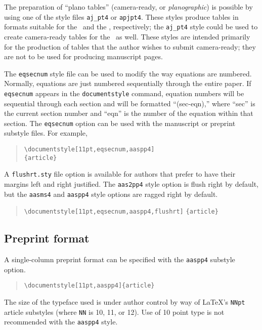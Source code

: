 The preparation of ``plano tables'' (camera-ready, or {\sl planographic\/})
is possible by using one of the style files \verb"aj_pt4" or \verb"apjpt4".
These styles produce tables in formats suitable for the \aj\ and the
\apj, respectively; the \verb"aj_pt4" style could be used to create
camera-ready tables for the \pasp\ as well.  These styles are intended
primarily for the production of tables that the author wishes to
submit camera-ready; they are not to be used for producing manuscript pages.

The {\tt eqsecnum} style file can be used to modify the way equations are
numbered.  Normally, equations are just numbered sequentially through the 
entire paper.  If {\tt eqsecnum} appears in the {\tt documentstyle} command, 
equation 
numbers will be sequential through each section and will be formatted 
``(sec-eqn),'' where ``sec'' is the current section number and ``eqn'' is 
the number 
of the equation within that section.  The {\tt eqsecnum} option can be used 
with the manuscript or preprint substyle files.  For example,
\begin{quote}
\verb"\documentstyle[11pt,eqsecnum,aaspp4]"\\
\hspace*{2em}\verb"{article}"
\end{quote}

A \verb"flushrt.sty" file option is available for authors that prefer to have 
their margins left and right justified.
The {\tt aas2pp4} style option is flush right by default, but the {\tt aasms4}
and {\tt aaspp4} style options are ragged right by default.

\begin{quote}
\verb"\documentstyle[11pt,eqsecnum,aaspp4,flushrt]"
\hspace*{2em}\verb"{article}"
\end{quote}


\subsection{Preprint format}

A single-column preprint format can be specified with the {\tt aaspp4}
substyle option.
\begin{quote}
\verb"\documentstyle[11pt,aaspp4]{article}"
\end{quote}
The size of the typeface used is under author control by way of
\LaTeX's {\tt NNpt} article substyles (where {\tt NN} is 10, 11, or 12).
Use of 10 point type is not recommended with the {\tt aaspp4} style.

